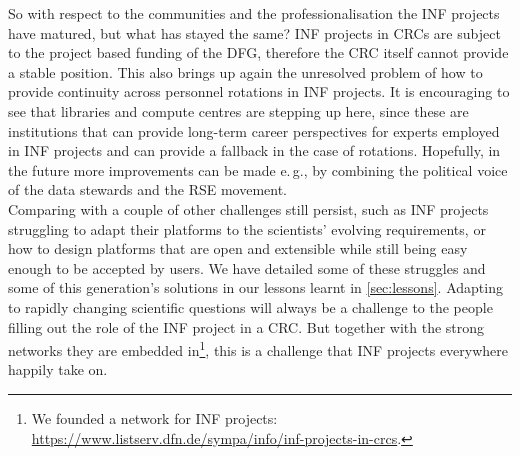 \documentclass{eceasst}
\newcommand{\eg}{e.\,g.}
\begin{document}
So with respect to the communities and the professionalisation the INF projects have matured, but what has stayed the same?
INF projects in CRCs are subject to the project based funding of the DFG, therefore the CRC itself cannot provide a stable position.
This also brings up again the unresolved problem of how to provide continuity across personnel rotations in INF projects.
It is encouraging to see that libraries and compute centres are stepping up here, since these are institutions that
can provide long-term career perspectives for experts employed in INF projects and can provide a fallback in the case of rotations.
Hopefully, in the future more improvements can be made \eg, by combining the political voice of the data stewards and the RSE movement.\\
Comparing with \cite{mueckschel2006} a couple of other challenges still persist, such as INF projects struggling
to adapt their platforms to the scientists’ evolving requirements, or how to design platforms that are open and extensible
while still being easy enough to be accepted by users.
We have detailed some of these struggles and some of this generation’s solutions in our lessons learnt in \autoref{sec:lessons}.
Adapting to rapidly changing scientific questions will always be a challenge to the people filling out the role of the INF project in a CRC.
But together with the strong networks they are embedded in\footnote{
We founded a network for INF projects: \url{https://www.listserv.dfn.de/sympa/info/inf-projects-in-crcs}.
}, this is a challenge that INF projects everywhere happily take on.
\end{document}
